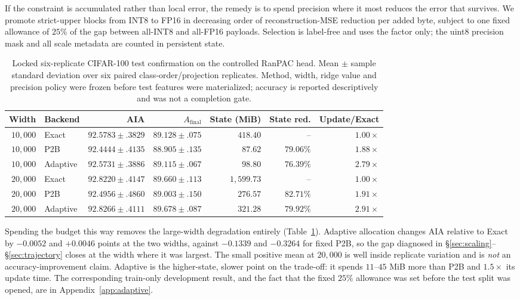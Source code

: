 \documentclass{article}
\begin{document}
If the constraint is accumulated rather than local error, the remedy is to
spend precision where it most reduces the error that survives. We promote
strict-upper blocks from INT8 to FP16 in decreasing order of reconstruction-MSE
reduction per added byte, subject to one fixed allowance of $25\%$ of the gap
between all-INT8 and all-FP16 payloads. Selection is label-free and uses the
factor only; the uint8 precision mask and all scale metadata are counted in
persistent state.

\begin{table}[t]
\caption{Locked six-replicate CIFAR-100 test confirmation on the controlled
RanPAC head. Mean $\pm$ sample standard deviation over six paired
class-order/projection replicates. Method, width, ridge value and precision
policy were frozen before test features were materialized; accuracy is
reported descriptively and was not a completion gate.}
\label{tab:m12}
\centering
\small
\begin{tabular}{rlrrrrr}
\toprule
Width & Backend & AIA & $A_{\mathrm{final}}$ & State (MiB) & State red. & Update/Exact\\
\midrule
$10{,}000$ & Exact    & $92.5783\pm.3829$ & $89.128\pm.075$ & $418.40$  & --      & $1.00\times$\\
$10{,}000$ & P2B      & $92.4444\pm.4135$ & $88.905\pm.135$ & $87.62$   & $79.06\%$ & $1.88\times$\\
$10{,}000$ & Adaptive & $92.5731\pm.3886$ & $89.115\pm.067$ & $98.80$   & $76.39\%$ & $2.79\times$\\
\midrule
$20{,}000$ & Exact    & $92.8220\pm.4147$ & $89.660\pm.113$ & $1{,}599.73$ & --   & $1.00\times$\\
$20{,}000$ & P2B      & $92.4956\pm.4860$ & $89.003\pm.150$ & $276.57$  & $82.71\%$ & $1.91\times$\\
$20{,}000$ & Adaptive & $92.8266\pm.4111$ & $89.678\pm.087$ & $321.28$  & $79.92\%$ & $2.91\times$\\
\bottomrule
\end{tabular}
\end{table}

Spending the budget this way removes the large-width degradation entirely
(Table~\ref{tab:m12}). Adaptive allocation changes AIA relative to Exact by
$-0.0052$ and $+0.0046$ points at the two widths, against $-0.1339$ and
$-0.3264$ for fixed P2B, so the gap diagnosed in
\S\ref{sec:scaling}--\S\ref{sec:trajectory} closes at the width where it was
largest. The small positive mean at $20{,}000$ is well inside replicate
variation and is \emph{not} an accuracy-improvement claim. Adaptive is the
higher-state, slower point on the trade-off: it spends $11$--$45$ MiB more than
P2B and $1.5\times$ its update time. The corresponding train-only development
result, and the fact that the fixed $25\%$ allowance was set before the test
split was opened, are in Appendix~\ref{app:adaptive}.
\end{document}
